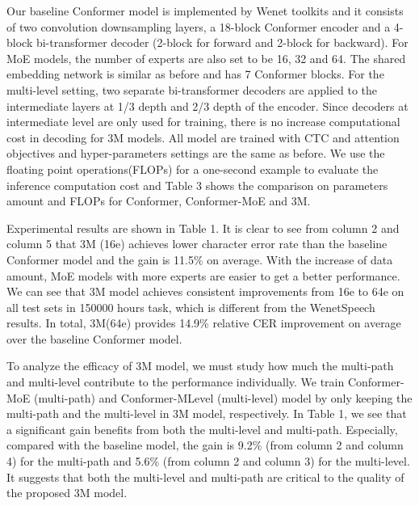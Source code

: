 \documentclass[a4paper]{article}
\begin{document}
Our baseline Conformer model is implemented by Wenet toolkits and it consists of two convolution downsampling layers, a 18-block Conformer encoder and a 4-block bi-transformer decoder (2-block for forward and 2-block for backward). For MoE models, the number of experts are also set to be 16, 32 and 64. The shared embedding network is similar as before and has 7 Conformer blocks. For the multi-level setting, two separate bi-transformer decoders are applied to the intermediate layers at 1/3 depth and 2/3 depth of the encoder. Since decoders at intermediate level are only used for training, there is no increase computational cost in decoding for 3M models. All model are trained with CTC and attention objectives and hyper-parameters settings are the same as before. We use the floating point operations(FLOPs) for a one-second example to evaluate the inference computation cost and Table 3 shows the comparison on parameters amount and FLOPs for Conformer, Conformer-MoE and 3M.

Experimental results are shown in Table 1.
It is clear to see from column 2 and column 5 that 3M (16e) achieves lower character error rate than the baseline Conformer model and the gain is 11.5\% on average.
With the increase of data amount, MoE models with more experts are easier to get a better performance. We can see that 3M model achieves consistent improvements from 16e to 64e on all test sets in 150000 hours task, which is different from the WenetSpeech results. In total, 3M(64e) provides 14.9\% relative CER improvement on average over the baseline Conformer model.

To analyze the efficacy of 3M model, we must study how much the multi-path and multi-level contribute to the performance individually.  We train Conformer-MoE (multi-path) and Conformer-MLevel (multi-level) model by only keeping the multi-path and the multi-level in 3M model, respectively. In Table 1, we see that a significant gain benefits from both the multi-level and multi-path. Especially, compared with the baseline model, the gain is 9.2\% (from column 2 and column 4) for the multi-path and 5.6\% (from column 2 and column 3) for the multi-level. It suggests that  both the multi-level and multi-path are critical to the quality of the proposed 3M model.
\end{document}
